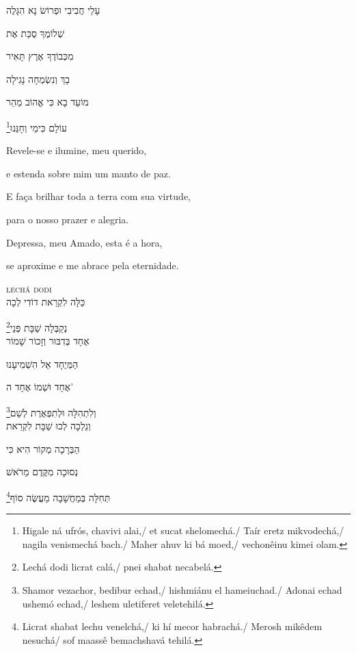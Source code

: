 עָלַי חֲבִיבִי וּפְרוֹשׂ נָא הִגָּלֶה

שְׁלוֹמֶךָ סֻכַּת אֶת

מִכְּבוֹדֶךָ אֶרֶץ תָּאִיר

בָךְ וְנִשְׂמְחָה נָגִילָה

מוֹעֵד בָא כִּי אֱהוֹב מַהֵר

\footnote{Higale ná ufrós, chavivi alai,/ et sucat shelomechá./ Taír eretz mikvodechá,/ nagila venismechá bach./ Maher ahuv ki bá moed,/ vechonêinu kimei olam.}עוֹלָם כִּימֵי וְחָנֵּנוּ


\movetooddpage
\raggedright %

\vspace*{1cm}

Revele-se e ilumine, meu querido,

e estenda sobre mim um manto de paz.

E faça brilhar toda a terra com sua virtude,

para o nosso prazer e alegria.

Depressa, meu Amado, esta é a hora,

se aproxime e me abrace pela eternidade.



\movetoevenpage
\raggedleft
{}

\vspace*{1cm}

\textsc{lechá dodi}\\[15pt]

כַּלָּה לִקְרַאת דוֹדִי לְכָה

\footnote{Lechá dodi licrat calá,/ pnei shabat necabelá.}נְקַבְּלָה שַׁבָּת פְּנֵי\\[10pt]

אֶחָד בְּדִבּוּר וְזָכוֹר שָׁמוֹר

הַמְּיֻחָד אֵל הִשְׁמִיעָנוּ

אֶחָד וּשְׁמוֹ אֶחָד ה' 

\footnote{Shamor vezachor, bedibur echad,/ hishmiánu el hameiuchad./ Adonai echad ushemó echad,/ leshem uletiferet veletehilá.}וְלִתְהִלָּה וּלְתִפְאֶרֶת לְשֵׁם\\[10pt]

וְנֵלְכָה לְכוּ שַׁבָּת לִקְרַאת

הַבְּרָכָה מְקוֹר הִיא כִּי

נְסוּכָה מִקֶּדֶם מֵרֹאשׁ 

\footnote{Licrat shabat lechu venelchá,/ ki hí mecor habrachá./ Merosh mikêdem nesuchá/ sof maassê bemachshavá tehilá.}תְּחִלָּה בְּמַחֲשָׁבָה מַעֲשֶּׂה סוֹף\\[10pt]

